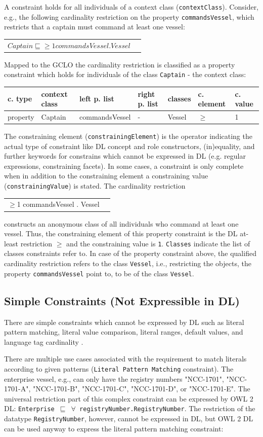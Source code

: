\documentclass{llncs}
\newcommand{\ms}[1]{\texttt{#1}}
\newenvironment{gcotable}{
  \scriptsize
  \sffamily
  \vspace{0.3cm}
	\begin{center}
  \begin{tabular}{l|l|l|l|l|l|l}
  \hline
  \textbf{c. type} & \textbf{context class} & \textbf{left p. list} & \textbf{right p. list} & \textbf{classes} & \textbf{c. element} & \textbf{c. value} \\
  \hline

}{
  \hline
  \end{tabular}
	\end{center}
}
\newenvironment{DL}{
  \vspace{0.3cm}
	\begin{center}
  \begin{tabular}{r l}

}{
  \end{tabular}
	\end{center}
}
\begin{document}
A constraint holds for all individuals of a context class (\ms{contextClass}).
Consider, e.g., the following cardinality restriction on the property \ms{commandsVessel}, which restricts that a captain must command at least one vessel: 
\begin{DL}
$Captain \sqsubseteq \geq1 commandsVessel . Vessel $
\end{DL}
Mapped to the GCLO the cardinality restriction is classified as a property constraint which holds for individuals of the class \ms{Captain} - the context class:
\begin{gcotable}
property & Captain & commandsVessel & - & Vessel & $\geq$ & 1 \\
\end{gcotable}
The constraining element (\ms{constrainingElement}) is the operator indicating the actual type of constraint like DL concept and role constructors, (in)equality, and further keywords for constrains which cannot be expressed in DL (e.g. regular expressions, constraining facets).
In some cases, a constraint is only complete when in addition to the constraining element a constraining value (\ms{constrainingValue}) is stated.
The cardinality restriction 
\begin{DL}
$\geq$1 commandsVessel . Vessel
\end{DL}
constructs an anonymous class of all individuals who command at least one vessel.
Thus, the constraining element of this property constraint is the DL at-least restriction \ms{$\geq$} and the constraining value is \ms{1}.
\ms{Classes} indicate the list of classes constraints refer to.
In case of the property constraint above, the qualified cardinality restriction refers to the class \ms{Vessel}, 
i.e., restricting the objects, the property \ms{commandsVessel} point to, to be of the class \ms{Vessel}.

\subsection{Simple Constraints (Not Expressible in DL)}

There are simple constraints which cannot be expressed by DL such as literal pattern matching, literal value comparison, literal ranges, default values, and language tag cardinality \cite{BoschNolleAcarEckert2015}.


There are multiple use cases associated with the requirement to match literals according to given patterns (\ms{Literal Pattern Matching} constraint).
The enterprise vessel, e.g.,  can only have the registry numbers "NCC-1701", "NCC-1701-A", "NCC-1701-B", "NCC-1701-C", "NCC-1701-D", or "NCC-1701-E".
The universal restriction part of this complex constraint can be expressed by OWL 2 DL:
\ms{Enterprise $\sqsubseteq$ $\forall$ registryNumber.RegistryNumber}.
The restriction of the datatype \ms{RegistryNumber}, however, cannot be expressed in DL, but OWL 2 DL can be used anyway to express the literal pattern matching constraint:
\end{document}
